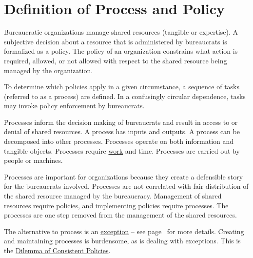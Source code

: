\section{Definition of Process and Policy\label{sec:definition-of-process}}


Bureaucratic organizations manage shared resources (tangible or expertise). 
A subjective decision about a resource that is administered by bureaucrats is formalized as a \gls{policy}.
The policy of an organization constrains what action is required, allowed, or not allowed with respect to the shared resource being managed by the organization.

To determine which policies apply in a given circumstance, a sequence of tasks (referred to as a \gls{process}) are defined. 
In a confusingly circular dependence, tasks may invoke policy enforcement by bureaucrats. 

Processes inform the decision making of bureaucrats and result in access to or denial of shared resources. 
A process has inputs and outputs. 
A process can be decomposed into other processes. 
Processes operate on both information and tangible objects. 
Processes require \href{https://en.wikipedia.org/wiki/Work_(physics)}{work}
and time. 
Processes are carried out by people or machines.

Processes are important for organizations because they create a defensible story for the bureaucrats involved. Processes are not correlated with fair distribution of the shared resource managed by the bureaucracy. Management of shared resources require policies, and implementing policies require processes. The processes are one step removed from the management of the shared resources. 


The alternative to process is an \hyperref[sec:exceptions-to-process]{exception} -- see 
 page~\pageref{sec:exceptions-to-process} 
 for more details. 
Creating and maintaining processes is burdensome, as is dealing with exceptions. This is the \hyperref[table:dilemma-personal-policy-consistency-across-cases]{Dilemma of Consistent Policies}.

\ \\

